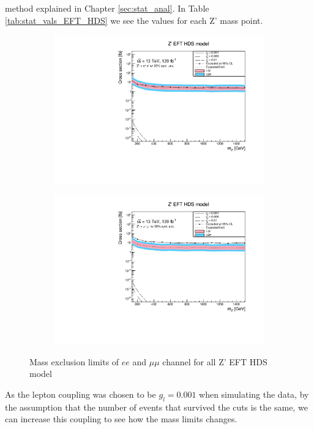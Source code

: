 \documentclass[14pt, a4paper]{book}
\begin{document}
method explained in Chapter \ref{sec:stat_anal}. In Table \ref{tab:stat_vals_EFT_HDS} we see the values for each Z' mass point.
\begin{figure}[!ht]
	\centering
   \begin{subfigure}[b]{0.49\textwidth}
      \centering
      \includegraphics[width=1\textwidth]{Limits/EFT_HDS/mass_exclusion_ee.pdf}
      \end{subfigure}
   \hfill
   \begin{subfigure}[b]{0.49\textwidth}
      \centering
      \includegraphics[width=1\textwidth]{Limits/EFT_HDS/mass_exclusion_uu.pdf}
      \end{subfigure}
   \caption{Mass exclusion limits of $ee$ and $\mu\mu$ channel for all Z' EFT HDS model}\label{fig:EFT_HDS_exclusion_ee_uu}
\end{figure}
As the lepton coupling was chosen to be $g_l=0.001$ when simulating the data, by the assumption that the number of events that survived the cuts is the same, we can increase this coupling to see how the mass limits changes.
\end{document}
